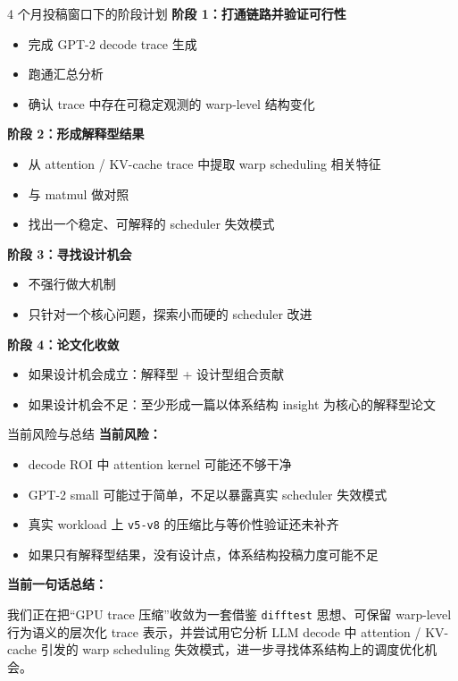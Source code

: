 \documentclass[aspectratio=169]{beamer}
\begin{document}
\begin{frame}{4 个月投稿窗口下的阶段计划}
\textbf{阶段 1：打通链路并验证可行性}
\begin{itemize}
  \item 完成 GPT-2 decode trace 生成
  \item 跑通汇总分析
  \item 确认 trace 中存在可稳定观测的 warp-level 结构变化
\end{itemize}

\textbf{阶段 2：形成解释型结果}
\begin{itemize}
  \item 从 attention / KV-cache trace 中提取 warp scheduling 相关特征
  \item 与 matmul 做对照
  \item 找出一个稳定、可解释的 scheduler 失效模式
\end{itemize}

\textbf{阶段 3：寻找设计机会}
\begin{itemize}
  \item 不强行做大机制
  \item 只针对一个核心问题，探索小而硬的 scheduler 改进
\end{itemize}

\textbf{阶段 4：论文化收敛}
\begin{itemize}
  \item 如果设计机会成立：解释型 + 设计型组合贡献
  \item 如果设计机会不足：至少形成一篇以体系结构 insight 为核心的解释型论文
\end{itemize}
\end{frame}

\begin{frame}{当前风险与总结}
\textbf{当前风险：}
\begin{itemize}
  \item decode ROI 中 attention kernel 可能还不够干净
  \item GPT-2 small 可能过于简单，不足以暴露真实 scheduler 失效模式
  \item 真实 workload 上 \texttt{v5-v8} 的压缩比与等价性验证还未补齐
  \item 如果只有解释型结果，没有设计点，体系结构投稿力度可能不足
\end{itemize}

\vspace{0.8em}
\textbf{当前一句话总结：}

\begin{block}{}
我们正在把“GPU trace 压缩”收敛为一套借鉴 \texttt{difftest} 思想、可保留 warp-level 行为语义的层次化 trace 表示，并尝试用它分析 LLM decode 中 attention / KV-cache 引发的 warp scheduling 失效模式，进一步寻找体系结构上的调度优化机会。
\end{block}
\end{frame}
\end{document}

